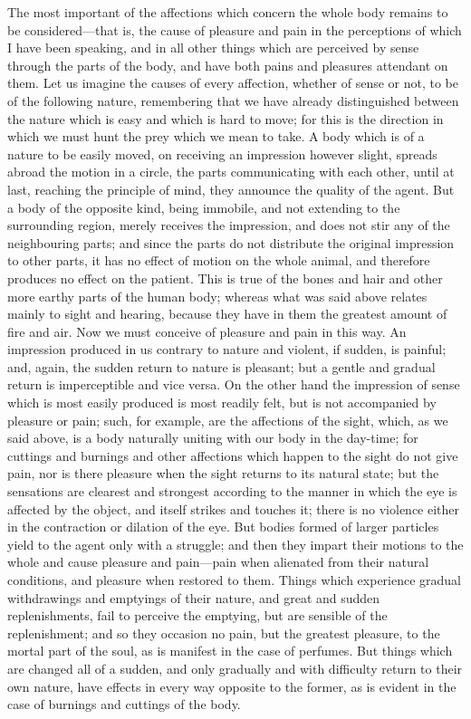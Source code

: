 The most important of the affections which concern the whole body remains
to be considered—that is, the cause of pleasure and pain in the
perceptions of which I have been speaking, and in all other things which
are perceived by sense through the parts of the body, and have both pains
and pleasures attendant on them. Let us imagine the causes of every
affection, whether of sense or not, to be of the following nature,
remembering that we have already distinguished between the nature which is
easy and which is hard to move; for this is the direction in which we must
hunt the prey which we mean to take. A body which is of a nature to be
easily moved, on receiving an impression however slight, spreads abroad
the motion in a circle, the parts communicating with each other, until at
last, reaching the principle of mind, they announce the quality of the
agent. But a body of the opposite kind, being immobile, and not extending
to the surrounding region, merely receives the impression, and does not
stir any of the neighbouring parts; and since the parts do not distribute
the original impression to other parts, it has no effect of motion on the
whole animal, and therefore produces no effect on the patient. This is
true of the bones and hair and other more earthy parts of the human body;
whereas what was said above relates mainly to sight and hearing, because
they have in them the greatest amount of fire and air. Now we must
conceive of pleasure and pain in this way. An impression produced in us
contrary to nature and violent, if sudden, is painful; and, again, the
sudden return to nature is pleasant; but a gentle and gradual return is
imperceptible and vice versa. On the other hand the impression of sense
which is most easily produced is most readily felt, but is not accompanied
by pleasure or pain; such, for example, are the affections of the sight,
which, as we said above, is a body naturally uniting with our body in the
day-time; for cuttings and burnings and other affections which happen to
the sight do not give pain, nor is there pleasure when the sight returns
to its natural state; but the sensations are clearest and strongest
according to the manner in which the eye is affected by the object, and
itself strikes and touches it; there is no violence either in the
contraction or dilation of the eye. But bodies formed of larger particles
yield to the agent only with a struggle; and then they impart their
motions to the whole and cause pleasure and pain—pain when alienated
from their natural conditions, and pleasure when restored to them. Things
which experience gradual withdrawings and emptyings of their nature, and
great and sudden replenishments, fail to perceive the emptying, but are
sensible of the replenishment; and so they occasion no pain, but the
greatest pleasure, to the mortal part of the soul, as is manifest in the
case of perfumes. But things which are changed all of a sudden, and only
gradually and with difficulty return to their own nature, have effects in
every way opposite to the former, as is evident in the case of burnings
and cuttings of the body.

